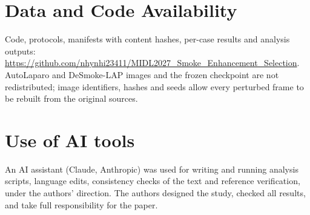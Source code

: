 \documentclass{midl}
\begin{document}
\section*{Data and Code Availability}
Code, protocols, manifests with content hashes, per-case results and analysis outputs: \url{https://github.com/nhynhi23411/MIDL2027_Smoke_Enhancement_Selection}. AutoLaparo and DeSmoke-LAP images and the frozen checkpoint are not redistributed; image identifiers, hashes and seeds allow every perturbed frame to be rebuilt from the original sources.

\section*{Use of AI tools}
An AI assistant (Claude, Anthropic) was used for writing and running analysis scripts, language edits, consistency checks of the text and reference verification, under the authors' direction. The authors designed the study, checked all results, and take full responsibility for the paper.


\appendix
\end{document}
